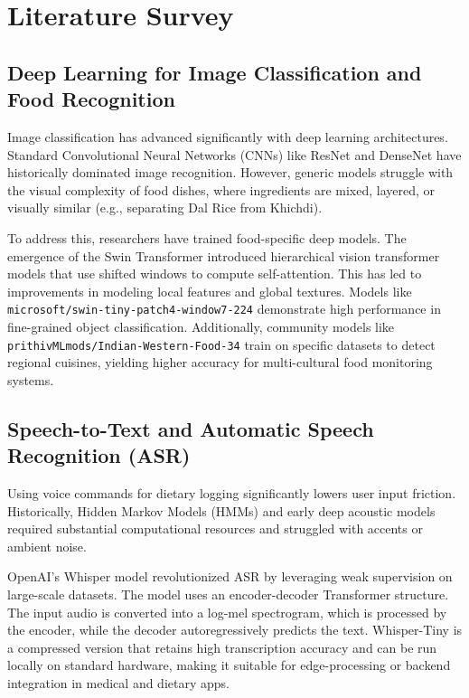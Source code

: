 \documentclass[12pt,a4paper,oneside]{report}
\begin{document}
\chapter{Literature Survey}
\label{ch:lit_survey}

\section{Deep Learning for Image Classification and Food Recognition}
Image classification has advanced significantly with deep learning architectures. Standard Convolutional Neural Networks (CNNs) like ResNet \cite{he2016deep} and DenseNet \cite{huang2017densely} have historically dominated image recognition. However, generic models struggle with the visual complexity of food dishes, where ingredients are mixed, layered, or visually similar (e.g., separating Dal Rice from Khichdi). 

To address this, researchers have trained food-specific deep models. The emergence of the Swin Transformer \cite{liu2021swin} introduced hierarchical vision transformer models that use shifted windows to compute self-attention. This has led to improvements in modeling local features and global textures. Models like \texttt{microsoft/swin-tiny-patch4-window7-224} demonstrate high performance in fine-grained object classification. Additionally, community models like \texttt{prithivMLmods/Indian-Western-Food-34} train on specific datasets to detect regional cuisines, yielding higher accuracy for multi-cultural food monitoring systems.

\section{Speech-to-Text and Automatic Speech Recognition (ASR)}
Using voice commands for dietary logging significantly lowers user input friction. Historically, Hidden Markov Models (HMMs) and early deep acoustic models required substantial computational resources and struggled with accents or ambient noise. 

OpenAI's Whisper model \cite{radford2022robust} revolutionized ASR by leveraging weak supervision on large-scale datasets. The model uses an encoder-decoder Transformer structure. The input audio is converted into a log-mel spectrogram, which is processed by the encoder, while the decoder autoregressively predicts the text. Whisper-Tiny is a compressed version that retains high transcription accuracy and can be run locally on standard hardware, making it suitable for edge-processing or backend integration in medical and dietary apps.
\end{document}
